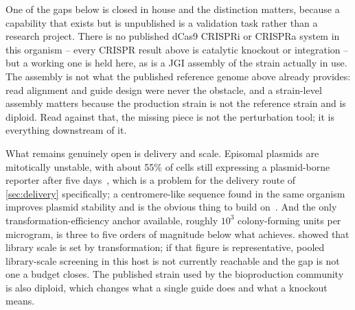 One of the gaps below is closed in house and the distinction matters, because a
capability that exists but is unpublished is a validation task rather than a
research project. There is no published dCas9 CRISPRi or CRISPRa system in this
organism -- every CRISPR result above is catalytic knockout or integration --
but a working one is held here, as is a JGI
assembly of the strain actually in use. The
assembly is not what the published reference genome above already provides: read
alignment and guide design were never the obstacle, and a strain-level assembly
matters because the production strain is not the reference strain and is diploid.
Read against that, the missing piece is not the perturbation tool; it is
everything downstream of it.

What remains genuinely open is delivery and scale. Episomal plasmids are
mitotically unstable, with about 55\% of cells still expressing a plasmid-borne
reporter after five days~\citep{tranDevelopmentCRISPRCas9Based2019}, which is a
problem for the delivery route of \cref{sec:delivery} specifically; a
centromere-like sequence found in the same organism improves plasmid stability
and is the obvious thing to build
on~\citep{caoGeneticToolboxMetabolic2020}. And the only
transformation-efficiency anchor available, roughly $10^{3}$ colony-forming
units per microgram, is three to five orders of magnitude below what
 achieves.  showed that library
scale is set by transformation; if that figure is representative, pooled
library-scale screening in this host is not currently reachable and the gap is
not one a budget closes. The published strain used by the bioproduction
community is also diploid, which changes what a single guide does and what a
knockout means.

